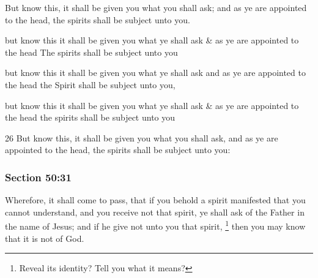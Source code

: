 		But know this, it shall be given you what you shall ask; and as ye are appointed to the head, the spirits shall be subject unto you.

		\begin{framed}
		\scriptsize
			\begin{compactdesc}
				\item[JSP] but know this it shall be given you what ye shall ask \& as ye are appointed to the head The spirits shall be subject unto you
				\item[Gilbert] but know this it shall be given you what ye shall ask and as ye are appointed to the head the Spirit shall be subject unto you,
				\item[Hyde and Smith] but know this it shall be given you what ye shall ask \& as ye are appointed to the head the spirits shall be subject unto you
				\item[BC] 26 But know this, it shall be given you what you shall ask, and as ye are appointed to the head, the spirits shall be subject unto you:
			\end{compactdesc}
		\end{framed}

	\subsubsection{Section 50:31} %
		\label{DC50-31}

		Wherefore, it shall come to pass, that if you behold a spirit manifested that you cannot understand, and you receive not that spirit, ye shall ask of the Father in the name of Jesus; and if he give not unto you that spirit,%
			\footnote{%
				Reveal its identity? Tell you what it means?
				}
		then you may know that it is not of God.

